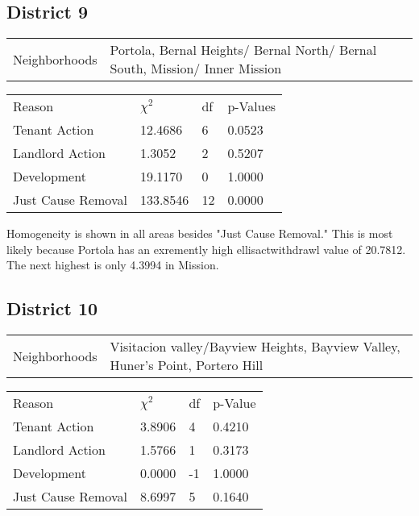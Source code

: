\documentclass[]{article}
\begin{document}
\subsection{District 9}

\begin {table}[!h]
\centering
\begin{tabular}{l | l}
	Neighborhoods &  Portola, Bernal Heights/ Bernal North/ Bernal South, Mission/ Inner Mission
\end{tabular}
\begin{tabular}{l | l | l | l}
	
	Reason				 &  $\chi ^{2}$ & df & p-Values\\
	Tenant Action 		   & 12.4686   &  6 & 0.0523 \\
	Landlord Action	       &  1.3052  & 2  & 0.5207 \\
	Development			   &  19.1170  & 0  & 1.0000 \\
	Just Cause Removal	   &  133.8546  & 12  & 0.0000 \\
\end{tabular} \newline
\end{table}
\FloatBarrier

Homogeneity is shown in all areas besides "Just Cause Removal." This is most likely because Portola has an exremently high ellisactwithdrawl value of 20.7812. The next highest is only 4.3994 in Mission.  

\subsection{District 10}

\begin {table}[!h]
\centering
\begin{tabular}{l | l}
	Neighborhoods & Visitacion valley/Bayview Heights, Bayview Valley, Huner's Point, Portero Hill
\end{tabular}
\begin{tabular}{l | l | l | l}
	
	Reason				 &  $\chi ^{2}$ & df & p-Value \\
	Tenant Action 		   &  3.8906  &  4  & 0.4210 \\
	Landlord Action	       &  1.5766  &  1  & 0.3173 \\
	Development			   &  0.0000  &  -1  & 1.0000 \\
	Just Cause Removal	   &  8.6997  &  5  & 0.1640 \\
\end{tabular} \newline
\end{table}
\FloatBarrier
\end{document}
